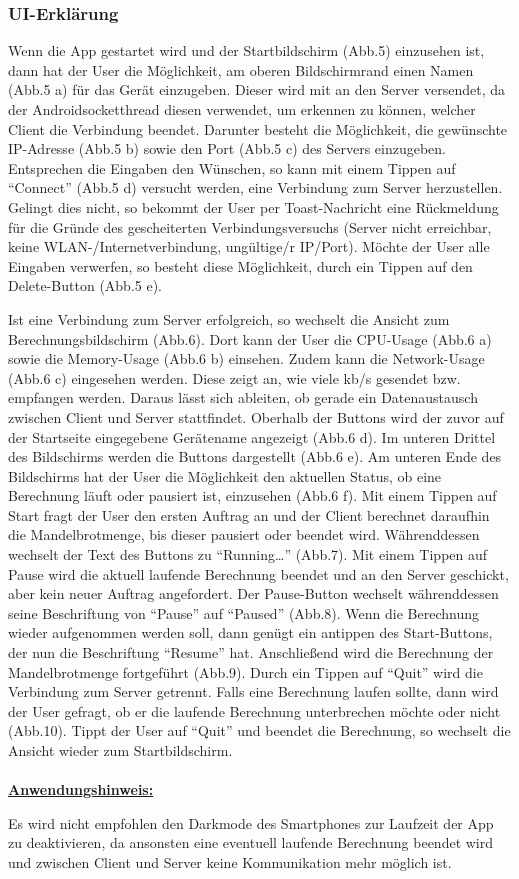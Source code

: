 \documentclass[12pt, onecolumn, notitlepage]{scrartcl}
\begin{document}
\subsubsection{UI-Erklärung}
Wenn die App gestartet wird und der Startbildschirm (Abb.5) einzusehen ist, dann hat der User die Möglichkeit, am oberen Bildschirmrand einen Namen (Abb.5 a) für das Gerät einzugeben. Dieser wird mit an den Server versendet, da der Androidsocketthread diesen verwendet, um erkennen zu können, welcher Client die Verbindung beendet. Darunter besteht die Möglichkeit, die gewünschte IP-Adresse (Abb.5 b) sowie den Port (Abb.5 c) des Servers einzugeben. Entsprechen die Eingaben den Wünschen, so kann mit einem Tippen auf \enquote{Connect} (Abb.5 d) versucht werden, eine Verbindung zum Server herzustellen. Gelingt dies nicht, so bekommt der User per Toast-Nachricht eine Rückmeldung für die Gründe des gescheiterten Verbindungsversuchs (Server nicht erreichbar, keine WLAN-/Internetverbindung, ungültige/r IP/Port). 
Möchte der User alle Eingaben verwerfen, so besteht diese Möglichkeit, durch ein Tippen auf den Delete-Button (Abb.5 e). \par
Ist eine Verbindung zum Server erfolgreich, so wechselt die Ansicht zum Berechnungsbildschirm (Abb.6). Dort kann der User die CPU-Usage (Abb.6 a) sowie die Memory-Usage (Abb.6 b) einsehen. Zudem kann die Network-Usage (Abb.6 c) eingesehen werden. Diese zeigt an, wie viele kb/s gesendet bzw. empfangen werden. Daraus lässt sich ableiten, ob gerade ein Datenaustausch zwischen Client und Server stattfindet. Oberhalb der Buttons wird der zuvor auf der Startseite eingegebene Gerätename angezeigt (Abb.6 d). Im unteren Drittel des Bildschirms werden die Buttons dargestellt (Abb.6 e). Am unteren Ende des Bildschirms hat der User die Möglichkeit den aktuellen Status, ob eine Berechnung läuft oder pausiert ist, einzusehen (Abb.6 f). Mit einem Tippen auf Start fragt der User den ersten Auftrag an und der Client berechnet daraufhin die Mandelbrotmenge, bis dieser pausiert oder beendet wird. Währenddessen wechselt der Text des Buttons zu \enquote{Running…} (Abb.7). Mit einem Tippen auf Pause wird die aktuell laufende Berechnung beendet und an den Server geschickt, aber kein neuer Auftrag angefordert. Der Pause-Button wechselt währenddessen seine Beschriftung von \enquote{Pause} auf \enquote{Paused} (Abb.8). Wenn die Berechnung wieder aufgenommen werden soll, dann genügt ein antippen des Start-Buttons, der nun die Beschriftung \enquote{Resume} hat. Anschließend wird die Berechnung der Mandelbrotmenge fortgeführt (Abb.9). Durch ein Tippen auf \enquote{Quit} wird die Verbindung zum Server getrennt. Falls eine Berechnung laufen sollte, dann wird der User gefragt, ob er die laufende Berechnung unterbrechen möchte oder nicht (Abb.10). Tippt der User auf \enquote{Quit} und beendet die Berechnung, so wechselt die Ansicht wieder zum Startbildschirm. \\ \\
\underline{\textbf{Anwendungshinweis:}} \par
Es wird nicht empfohlen den Darkmode des Smartphones zur Laufzeit der App zu deaktivieren, da ansonsten eine eventuell laufende Berechnung beendet wird und zwischen Client und Server keine Kommunikation mehr möglich ist.
\end{document}
